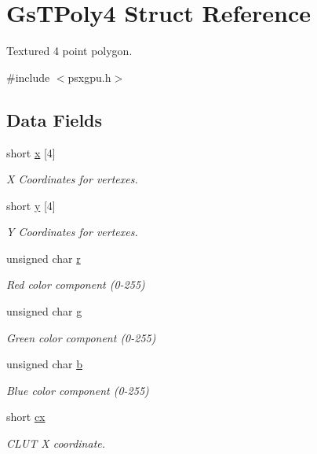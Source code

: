\hypertarget{structGsTPoly4}{}\section{Gs\+T\+Poly4 Struct Reference}
\label{structGsTPoly4}


Textured 4 point polygon.  




{\ttfamily \#include $<$psxgpu.\+h$>$}

\subsection*{Data Fields}
\begin{DoxyCompactItemize}
\item 
short \hyperlink{structGsTPoly4_a6348d047a5123bf2c7b6d70d96d216ae}{x} \mbox{[}4\mbox{]}
\begin{DoxyCompactList}\small\item\em X Coordinates for vertexes. \end{DoxyCompactList}\item 
short \hyperlink{structGsTPoly4_a0a64e0d7ce40b4a5690b5af814c4fd7d}{y} \mbox{[}4\mbox{]}
\begin{DoxyCompactList}\small\item\em Y Coordinates for vertexes. \end{DoxyCompactList}\item 
unsigned char \hyperlink{structGsTPoly4_a0fc04cf3a1c90b8e4b672908ba6cbd24}{r}
\begin{DoxyCompactList}\small\item\em Red color component (0-\/255) \end{DoxyCompactList}\item 
unsigned char \hyperlink{structGsTPoly4_a4fe23fe98949d3fc80cc851cf32f0f4e}{g}
\begin{DoxyCompactList}\small\item\em Green color component (0-\/255) \end{DoxyCompactList}\item 
unsigned char \hyperlink{structGsTPoly4_ab63bd47c343b40ec9a63e0d4a726cecc}{b}
\begin{DoxyCompactList}\small\item\em Blue color component (0-\/255) \end{DoxyCompactList}\item 
short \hyperlink{structGsTPoly4_a594a5d5e85f45941aac5187ff2dde2d2}{cx}
\begin{DoxyCompactList}\small\item\em C\+L\+UT X coordinate. \end{DoxyCompactList}\item 

\end{DoxyCompactItemize}
